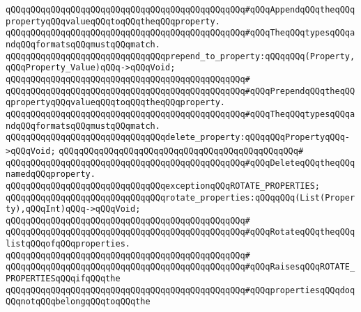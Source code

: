 \verb|qQQqqQQqqQQqqQQqqQQqqQQqqQQqqQQqqQQqqQQqqQQqqQQq#qQQqAppendqQQqtheqQQqpropertyqQQqvalueqQQqtoqQQqtheqQQqproperty.|\newline
\verb|qQQqqQQqqQQqqQQqqQQqqQQqqQQqqQQqqQQqqQQqqQQqqQQq#qQQqTheqQQqtypesqQQqandqQQqformatsqQQqmustqQQqmatch.|\newline
\newline
\newline
\verb|qQQqqQQqqQQqqQQqqQQqqQQqqQQqqQQqprepend_to_property:qQQqqQQq(Property,qQQqProperty_Value)qQQq->qQQqVoid;|\newline
\verb|qQQqqQQqqQQqqQQqqQQqqQQqqQQqqQQqqQQqqQQqqQQqqQQq#|\newline
\verb|qQQqqQQqqQQqqQQqqQQqqQQqqQQqqQQqqQQqqQQqqQQqqQQq#qQQqPrependqQQqtheqQQqpropertyqQQqvalueqQQqtoqQQqtheqQQqproperty.|\newline
\verb|qQQqqQQqqQQqqQQqqQQqqQQqqQQqqQQqqQQqqQQqqQQqqQQq#qQQqTheqQQqtypesqQQqandqQQqformatsqQQqmustqQQqmatch.|\newline
\newline
\newline
\newline
\verb|qQQqqQQqqQQqqQQqqQQqqQQqqQQqqQQqdelete_property:qQQqqQQqPropertyqQQq->qQQqVoid;|\newline
\verb|qQQqqQQqqQQqqQQqqQQqqQQqqQQqqQQqqQQqqQQqqQQqqQQq#|\newline
\verb|qQQqqQQqqQQqqQQqqQQqqQQqqQQqqQQqqQQqqQQqqQQqqQQq#qQQqDeleteqQQqtheqQQqnamedqQQqproperty.|\newline
\newline
\newline
\newline
\verb|qQQqqQQqqQQqqQQqqQQqqQQqqQQqqQQqexceptionqQQqROTATE_PROPERTIES;|\newline
\newline
\newline
\verb|qQQqqQQqqQQqqQQqqQQqqQQqqQQqqQQqrotate_properties:qQQqqQQq(List(Property),qQQqInt)qQQq->qQQqVoid;|\newline
\verb|qQQqqQQqqQQqqQQqqQQqqQQqqQQqqQQqqQQqqQQqqQQqqQQq#|\newline
\verb|qQQqqQQqqQQqqQQqqQQqqQQqqQQqqQQqqQQqqQQqqQQqqQQq#qQQqRotateqQQqtheqQQqlistqQQqofqQQqproperties.|\newline
\verb|qQQqqQQqqQQqqQQqqQQqqQQqqQQqqQQqqQQqqQQqqQQqqQQq#|\newline
\verb|qQQqqQQqqQQqqQQqqQQqqQQqqQQqqQQqqQQqqQQqqQQqqQQq#qQQqRaisesqQQqROTATE_PROPERTIESqQQqifqQQqthe|\newline
\verb|qQQqqQQqqQQqqQQqqQQqqQQqqQQqqQQqqQQqqQQqqQQqqQQq#qQQqpropertiesqQQqdoqQQqnotqQQqbelongqQQqtoqQQqthe|\newline
